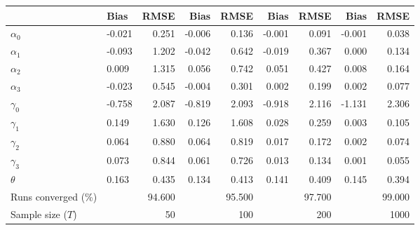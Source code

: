 
\begin{tabular}[t]{llrrrrrrr}
\toprule
  & Bias & RMSE & Bias & RMSE & Bias & RMSE & Bias & RMSE\\
\midrule
$\alpha_{0}$ & -0.021 & 0.251 & -0.006 & 0.136 & -0.001 & 0.091 & -0.001 & 0.038\\
$\alpha_{1}$ & -0.093 & 1.202 & -0.042 & 0.642 & -0.019 & 0.367 & 0.000 & 0.134\\
$\alpha_{2}$ & 0.009 & 1.315 & 0.056 & 0.742 & 0.051 & 0.427 & 0.008 & 0.164\\
$\alpha_{3}$ & -0.023 & 0.545 & -0.004 & 0.301 & 0.002 & 0.199 & 0.002 & 0.077\\
$\gamma_{0}$ & -0.758 & 2.087 & -0.819 & 2.093 & -0.918 & 2.116 & -1.131 & 2.306\\
$\gamma_{1}$ & 0.149 & 1.630 & 0.126 & 1.608 & 0.028 & 0.259 & 0.003 & 0.105\\
$\gamma_{2}$ & 0.064 & 0.880 & 0.064 & 0.819 & 0.017 & 0.172 & 0.002 & 0.074\\
$\gamma_{3}$ & 0.073 & 0.844 & 0.061 & 0.726 & 0.013 & 0.134 & 0.001 & 0.055\\
$\theta$ & 0.163 & 0.435 & 0.134 & 0.413 & 0.141 & 0.409 & 0.145 & 0.394\\
Runs converged (\%) &  & 94.600 &  & 95.500 &  & 97.700 &  & 99.000\\
Sample size ($T$) &  & 50 &  & 100 &  & 200 &  & 1000\\
\bottomrule
\end{tabular}
